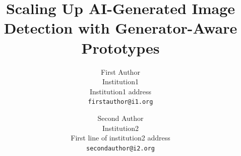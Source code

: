 \documentclass[10pt,twocolumn,letterpaper]{article}
\title{Scaling Up AI-Generated Image Detection with Generator-Aware Prototypes}
\author{First Author\\
Institution1\\
Institution1 address\\
{\tt\small firstauthor@i1.org}
\and
Second Author\\
Institution2\\
First line of institution2 address\\
{\tt\small secondauthor@i2.org}
}
\begin{document}

\clearpage      %
{
    \small
    
    
}

\end{document}
